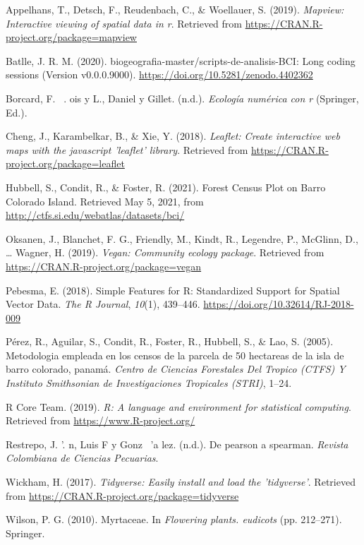 \documentclass[11pt,]{article}
\begin{document}
\hypertarget{refs}{}
\hypertarget{ref-mapview}{}
Appelhans, T., Detsch, F., Reudenbach, C., \& Woellauer, S. (2019).
\emph{Mapview: Interactive viewing of spatial data in r}. Retrieved from
\url{https://CRAN.R-project.org/package=mapview}

\hypertarget{ref-jose_ramon_martinez_batlle_2020_4402362}{}
Batlle, J. R. M. (2020). biogeografia-master/scripts-de-analisis-BCI:
Long coding sessions (Version v0.0.0.9000).
\url{https://doi.org/10.5281/zenodo.4402362}

\hypertarget{ref-borcard2018numerical}{}
Borcard, F. ~. ois y L., Daniel y Gillet. (n.d.). \emph{Ecología
numérica con r} (Springer, Ed.).

\hypertarget{ref-leaflet}{}
Cheng, J., Karambelkar, B., \& Xie, Y. (2018). \emph{Leaflet: Create
interactive web maps with the javascript 'leaflet' library}. Retrieved
from \url{https://CRAN.R-project.org/package=leaflet}

\hypertarget{ref-webcenso}{}
Hubbell, S., Condit, R., \& Foster, R. (2021). Forest Census Plot on
Barro Colorado Island. Retrieved May 5, 2021, from
\url{http://ctfs.si.edu/webatlas/datasets/bci/}

\hypertarget{ref-vegan}{}
Oksanen, J., Blanchet, F. G., Friendly, M., Kindt, R., Legendre, P.,
McGlinn, D., \ldots{} Wagner, H. (2019). \emph{Vegan: Community ecology
package}. Retrieved from \url{https://CRAN.R-project.org/package=vegan}

\hypertarget{ref-sf}{}
Pebesma, E. (2018). Simple Features for R: Standardized Support for
Spatial Vector Data. \emph{The R Journal}, \emph{10}(1), 439--446.
\url{https://doi.org/10.32614/RJ-2018-009}

\hypertarget{ref-perez2005metodologia}{}
Pérez, R., Aguilar, S., Condit, R., Foster, R., Hubbell, S., \& Lao, S.
(2005). Metodologia empleada en los censos de la parcela de 50 hectareas
de la isla de barro colorado, panamá. \emph{Centro de Ciencias
Forestales Del Tropico (CTFS) Y Instituto Smithsonian de Investigaciones
Tropicales (STRI)}, 1--24.

\hypertarget{ref-citadeR}{}
R Core Team. (2019). \emph{R: A language and environment for statistical
computing}. Retrieved from \url{https://www.R-project.org/}

\hypertarget{ref-restrepo2007pearson}{}
Restrepo, J. '. n, Luis F y Gonz ~'a lez. (n.d.). De pearson a spearman.
\emph{Revista Colombiana de Ciencias Pecuarias}.

\hypertarget{ref-tidyverse}{}
Wickham, H. (2017). \emph{Tidyverse: Easily install and load the
'tidyverse'}. Retrieved from
\url{https://CRAN.R-project.org/package=tidyverse}

\hypertarget{ref-wilson2010myrtaceae}{}
Wilson, P. G. (2010). Myrtaceae. In \emph{Flowering plants. eudicots}
(pp. 212--271). Springer.




\newpage
\singlespacing 
\end{document}
